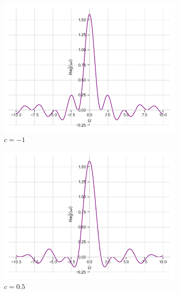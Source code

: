 \documentclass[a4paper, 16pt]{article}
\begin{document}
    \begin{figure}[htbp]
        \centering
        \begin{subfigure}{0.3\textwidth}
            \centering
            \includegraphics[width=\linewidth]{sh_m1_re_rectf_int12.png}
            \caption{$c=-1$}
            \label{fig:reshrectf_1}
        \end{subfigure}
        \hfill
        \begin{subfigure}{0.3\textwidth}
            \centering
            \includegraphics[width=\linewidth]{sh_zp5_re_rectf_int12.png}
            \caption{$c=0.5$}
            \label{fig:reshrectf_2}
        \end{subfigure}
        \hfill
        \begin{subfigure}{0.3\textwidth}

\end{subfigure}
\end{figure}
\end{document}
